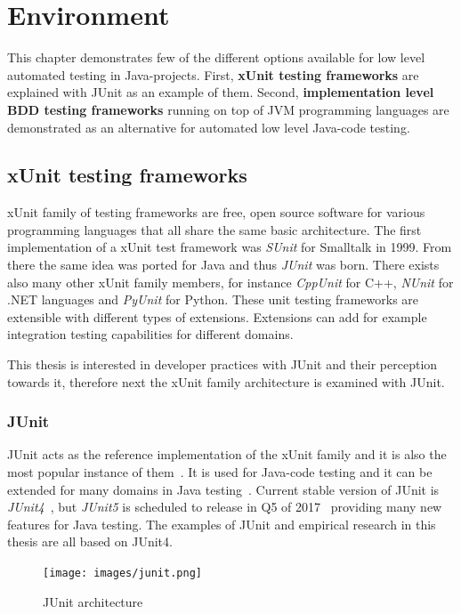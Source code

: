 \chapter{Environment}
\label{chapter:environment}
This chapter demonstrates few of the different options available for low level automated testing in Java-projects. First,
\textbf{xUnit testing frameworks} are explained with JUnit as an example of them. Second, \textbf{implementation level BDD testing frameworks}
running on top of JVM programming languages are demonstrated as an alternative for automated low level Java-code testing.

\section{xUnit testing frameworks} %
    xUnit family of testing frameworks are free, open source software for various programming languages that
    all share the same basic architecture. The first implementation of a xUnit test framework was \textit{SUnit}
    for Smalltalk in 1999.  From there the same idea was ported for Java and thus \textit{JUnit} was born. There exists also many other
    xUnit family members, for instance \textit{CppUnit} for C++, \textit{NUnit} for .NET languages and \textit{PyUnit} for Python.
    These unit testing frameworks are extensible with different types of extensions. Extensions can add for example integration testing capabilities
    for different domains. ~\cite{hamill2004unit}

    This thesis is interested in developer practices with JUnit and their perception towards it, therefore next the xUnit family architecture
    is examined with JUnit.

    \subsection{JUnit}
    JUnit acts as the reference implementation of the xUnit family and it is also the most popular instance of them~\cite{hamill2004unit}.
    It is used for Java-code testing and it can be extended for many domains in Java testing~\cite{hamill2004unit}.
    Current stable version of JUnit is \textit{JUnit4}~\cite{junit4}, but \textit{JUnit5} is scheduled to release in Q5 of 2017~\cite{junit5schedule}
    providing many new features for Java testing. The examples of JUnit and empirical research in this thesis are all based on JUnit4.

    \begin{figure}[ht]
      \begin{center}
        \texttt{[image: images/junit.png]}
        \caption{JUnit architecture}
        \label{fig:junit}
      \end{center}
    \end{figure}

